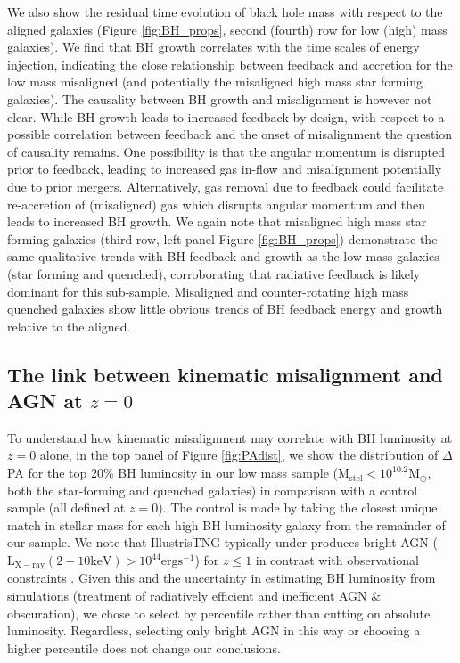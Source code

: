 We also show the residual time evolution of black hole mass with respect to the aligned galaxies (Figure \ref{fig:BH_props}, second (fourth) row for low (high) mass galaxies). We find that BH growth correlates with the time scales of energy injection, indicating the close relationship between feedback and accretion for the low mass misaligned (and potentially the misaligned high mass star forming galaxies). The causality between BH growth and misalignment is however not clear. While BH growth leads to increased feedback by design, with respect to a possible correlation between feedback and the onset of misalignment the question of causality remains. One possibility is that the angular momentum is disrupted prior to feedback, leading to increased gas in-flow and misalignment potentially due to prior mergers. Alternatively, gas removal due to feedback could facilitate re-accretion of (misaligned) gas which disrupts angular momentum and then leads to increased BH growth. We again note that misaligned high mass star forming galaxies (third row, left panel Figure \ref{fig:BH_props}) demonstrate the same qualitative trends with BH feedback and growth as the low mass galaxies (star forming and quenched), corroborating that radiative feedback is likely dominant for this sub-sample. Misaligned and counter-rotating high mass quenched galaxies show little obvious trends of BH feedback energy and growth relative to the aligned.

\subsection{The link between kinematic misalignment and AGN at $z=0$}
To understand how kinematic misalignment may correlate with BH luminosity at $z=0$ alone, in the top panel of Figure \ref{fig:PAdist}, we show the distribution of $\Delta$PA for the top 20\% BH luminosity in our low mass sample ($\mathrm{M_{stel} < 10^{10.2}M_{\odot}}$, both the star-forming and quenched galaxies) in comparison with a control sample (all defined at $z=0$). The control is made by taking the closest unique match in stellar mass for each high BH luminosity galaxy from the remainder of our sample. We note that IllustrisTNG typically under-produces bright AGN ($\mathrm{L_{X-ray}(2-10 keV) > 10^{44}ergs^{-1}}$) for $z \leq 1$ in contrast with observational constraints \citep[see][]{habouzit2019}. Given this and the uncertainty in estimating BH luminosity from simulations (treatment of radiatively efficient and inefficient AGN \& obscuration), we chose to select by percentile rather than cutting on absolute luminosity. Regardless, selecting only bright AGN in this way or choosing a higher percentile does not change our conclusions.

